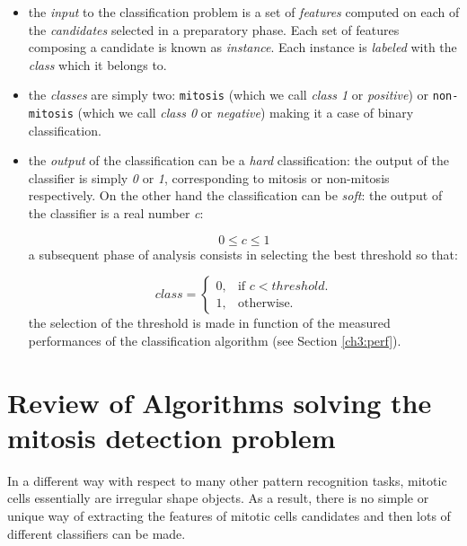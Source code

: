 \begin{itemize}
\item the \textit{input} to the classification problem is a set of \textit{features} computed on each of the \textit{candidates} selected in a preparatory phase.
    Each set of features composing a candidate is known as \textit{instance}. Each instance is \textit{labeled}  with the \textit{class} which it belongs to.
\item the \textit{classes} are simply two: \texttt{mitosis} (which we call \textit{class 1} or \textit{positive})
    or \texttt{non-mitosis} (which we call \textit{class 0} or \textit{negative}) making it a case of binary classification.
\item the \textit{output} of the classification can be a \textit{hard} classification: the output of the classifier is simply \textit{0} or \textit{1},
    corresponding to mitosis or non-mitosis respectively. On the other hand the classification can be \textit{soft}: the output of the classifier is a real number \textit{c}:

\begin{equation}
 0 \leq c \leq 1
\end{equation}
a subsequent phase of analysis consists in selecting the best threshold so that:

\begin{equation}
   \textit{class}=\begin{cases}
    0, & \text{if $c<threshold$}.\\
    1, & \text{otherwise}.
  \end{cases}
\end{equation}
the selection of the threshold is made in function of the measured performances of the classification algorithm (see Section \ref{ch3:perf}).

\end{itemize}

\vspace{0.5cm}

\section{Review of Algorithms solving the mitosis detection problem}
\label{ch3:review}

In a different way with respect to many other pattern recognition tasks, mitotic cells essentially are irregular shape objects. As a result, there
is no simple or unique way of extracting the features of mitotic cells candidates and then lots of different classifiers can be made.

